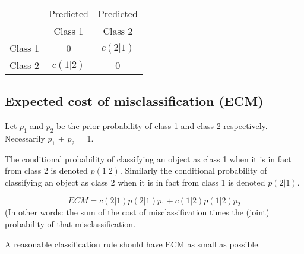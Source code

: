 \begin{tabular}{|c|c|c|}
  \hline
  & Predicted & Predicted \\
   & Class 1 & Class 2 \\  \hline
  Class 1 & 0 & $c(2|1)$  \\
  Class 2 & $c(1|2)$ & 0 \\
  \hline
\end{tabular}




\subsection{Expected cost of misclassification (ECM)}
Let $p_1$ and $p_2$ be the prior probability of class 1 and class 2 respectively.
Necessarily $p_1$ + $p_2$ = 1.

The conditional probability of classifying an object as class 1 when it is in fact from
class 2 is denoted $p(1|2)$.
Similarly the conditional probability of classifying an object as class 2 when it is in
fact from class 1 is denoted $p(2|1)$.

\[ECM = c(2|1)p(2|1)p_1 + c(1|2)p(1|2)p_2\]
(In other words: the sum of the cost of misclassification times the (joint) probability of that misclassification.

A reasonable classification rule should have ECM as small as possible.








